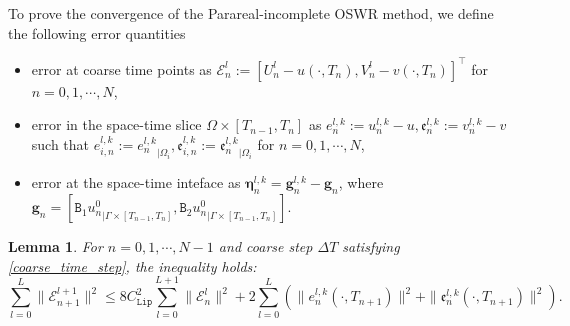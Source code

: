 \documentclass[11pt]{article}
\newtheorem{lemma}[theorem]{Lemma}
\begin{document}
To prove the convergence of the Parareal-incomplete OSWR method, we define the following error quantities
\begin{itemize}
 \item  error at coarse time points as $\mathcal{E}_{n}^l:=[U_n^l-u(\cdot, T_n), V_n^l-v(\cdot, T_n)]^{\top}$ for $n=0,1,\cdots, N$, 
 \item  error in the space-time slice $\Omega\times[T_{n-1}, T_n]$ as $e_n^{l,k}:=u_n^{l,k}-u, \mathfrak{e}_n^{l,k}:=v_n^{l,k}-v$ such that $e_{i,n}^{l,k}:= {e_n^{l,k}}_{|\Omega_i}, \mathfrak{e}_{i,n}^{l,k}:= {\mathfrak{e}_n^{l,k}}_{|\Omega_i}$ for $n=0,1,\cdots, N$,
 \item error at the space-time inteface as $ \boldsymbol{\eta}_n^{l,k}=  \boldsymbol{g}_n^{l,k}-  \boldsymbol{g}_n$, where $ \boldsymbol{g}_n=[{\mathtt{B}_1 u_n^{0}}_{|\Gamma\times [T_{n-1}, T_n]}, {\mathtt{B}_2 u_n^{0}}_{|\Gamma\times [T_{n-1}, T_n]}]$.
\end{itemize}
\begin{lemma}\label{PA_lemma1}
For $n=0,1, \cdots, N-1$ and coarse step $\Delta T$ satisfying \eqref{coarse_time_step}, the inequality holds:
\begin{equation}\label{PA_err}
\sum_{l=0}^{L} \parallel \mathcal{E}_{n+1}^{l+1}\parallel^2 \leq 8C_{\texttt{Lip}}^2 \sum_{l=0}^{L+1}  \parallel \mathcal{E}_{n}^{l}\parallel^2  + 2 \sum_{l=0}^L \left( \parallel e_n^{l,k}(\cdot, T_{n+1}) \parallel^2 + \parallel \mathfrak{e}_n^{l,k}(\cdot, T_{n+1}) \parallel^2 \right).
\end{equation}
\end{lemma}
\end{document}
